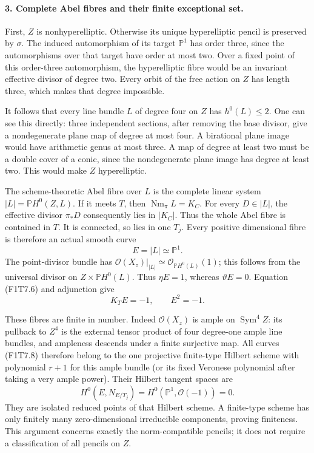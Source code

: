 \paragraph{3. Complete Abel fibres and their finite exceptional set.}
First, $Z$ is nonhyperelliptic. Otherwise its unique
hyperelliptic pencil is preserved by $\sigma$. The induced
automorphism of its target $\mathbb P^1$ has order three,
since the automorphisms over that target have order at most
two. Over a fixed point of this order-three automorphism,
the hyperelliptic fibre would be an invariant effective
divisor of degree two. Every orbit of the free action on $Z$
has length three, which makes that degree impossible.

It follows that every line bundle $L$ of degree four on $Z$
has $h^0(L)\leq2$. One can see this directly: three independent
sections, after removing the base divisor, give a nondegenerate
plane map of degree at most four. A birational plane image
would have arithmetic genus at most three. A map of degree
at least two must be a double cover of a conic, since the
nondegenerate plane image has degree at least two. This
would make $Z$ hyperelliptic.

The scheme-theoretic Abel fibre over $L$ is the complete
linear system $|L|=\mathbb P H^0(Z,L)$. If it meets $T$,
then $\operatorname{Nm}_\pi L=K_C$. For every $D\in|L|$,
the effective divisor $\pi_*D$ consequently lies in
$|K_C|$. Thus the whole Abel fibre is contained in $T$.
It is connected, so lies in one $T_j$. Every positive
dimensional fibre is therefore an actual smooth curve
\[
                         E=|L|\simeq\mathbb P^1.
 \tag{F1T7.8}
\]
The point-divisor bundle has
$\mathcal O(X_z)|_{|L|}\simeq\mathcal O_{\mathbb P H^0(L)}(1)$;
this follows from the universal divisor on
$Z\times\mathbb P H^0(L)$. Thus
$\eta E=1$, whereas $\vartheta E=0$.
Equation (F1T7.6) and adjunction give
\[
                         K_T E=-1,\qquad E^2=-1.
 \tag{F1T7.9}
\]

These fibres are finite in number. Indeed
$\mathcal O(X_z)$ is ample on $\operatorname{Sym}^4Z$:
its pullback to $Z^4$ is the external tensor product
of four degree-one ample line bundles, and ampleness
descends under a finite surjective map.
All curves (F1T7.8) therefore belong to the one
projective finite-type Hilbert scheme with polynomial
$r+1$ for this ample bundle (or its fixed Veronese
polynomial after taking a very ample power).
Their Hilbert tangent spaces are
\[
 H^0(E,N_{E/T_j})=H^0(\mathbb P^1,\mathcal O(-1))=0.
\]
They are isolated reduced points of that Hilbert scheme.
A finite-type scheme has only finitely many
zero-dimensional irreducible components, proving finiteness.
This argument concerns exactly the norm-compatible pencils;
it does not require a classification of all pencils on $Z$.

